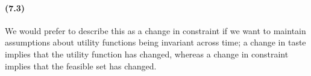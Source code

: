 \documentclass[10pt,letter]{article}
\begin{document}
\paragraph{(7.3)}
We would prefer to describe this as a change in constraint if we want to maintain assumptions about utility functions being invariant across time; a change in taste implies that the utility function has changed, whereas a change in constraint implies that the feasible set has changed.
\end{document}
